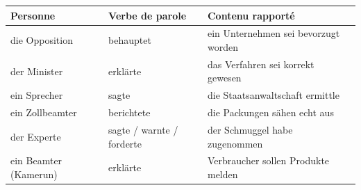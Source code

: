 \documentclass[11pt]{article}
\begin{document}
\begin{center}
\begin{tabularx}{\linewidth}{|X|X|X|}
\hline
\rowcolor{popblueL} \textbf{Personne} & \textbf{Verbe de parole} & \textbf{Contenu rapporté} \\
\hline
die Opposition & behauptet & ein Unternehmen sei bevorzugt worden \\
\hline
der Minister & erklärte & das Verfahren sei korrekt gewesen \\
\hline
ein Sprecher & sagte & die Staatsanwaltschaft ermittle \\
\hline
ein Zollbeamter & berichtete & die Packungen sähen echt aus \\
\hline
der Experte & sagte / warnte / forderte & der Schmuggel habe zugenommen \\
\hline
ein Beamter (Kamerun) & erklärte & Verbraucher sollen Produkte melden \\
\hline
\end{tabularx}
\end{center}
\end{document}
